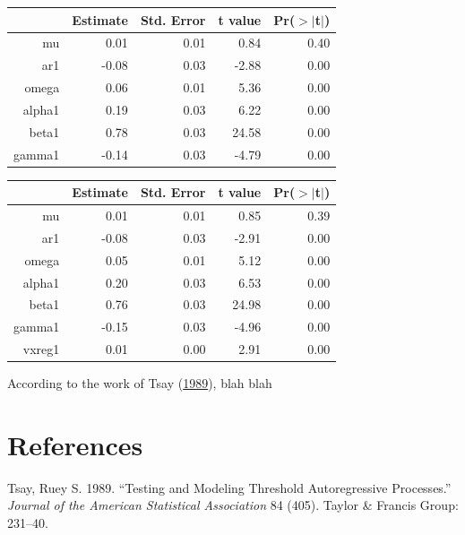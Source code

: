 \documentclass[11pt,preprint, authoryear]{elsarticle}
\let\origtable\table
\let\endorigtable\endtable
\renewenvironment{table}[1][2] {
    \expandafter\origtable\expandafter[H]
} {
    \endorigtable
}
\numberwithin{equation}{section}
\numberwithin{figure}{section}
\numberwithin{table}{section}
\begin{document}
\begin{table}[H]
\centering
\begin{tabular}{rrrrr}
  \hline
 &  Estimate &  Std. Error &  t value & Pr($>$$|$t$|$) \\ 
  \hline
mu & 0.01 & 0.01 & 0.84 & 0.40 \\ 
  ar1 & -0.08 & 0.03 & -2.88 & 0.00 \\ 
  omega & 0.06 & 0.01 & 5.36 & 0.00 \\ 
  alpha1 & 0.19 & 0.03 & 6.22 & 0.00 \\ 
  beta1 & 0.78 & 0.03 & 24.58 & 0.00 \\ 
  gamma1 & -0.14 & 0.03 & -4.79 & 0.00 \\ 
   \hline
\end{tabular}
\caption{GARCH11 \label{GARCH-A}} 
\end{table}\begin{table}[H]
\centering
\begin{tabular}{rrrrr}
  \hline
 &  Estimate &  Std. Error &  t value & Pr($>$$|$t$|$) \\ 
  \hline
mu & 0.01 & 0.01 & 0.85 & 0.39 \\ 
  ar1 & -0.08 & 0.03 & -2.91 & 0.00 \\ 
  omega & 0.05 & 0.01 & 5.12 & 0.00 \\ 
  alpha1 & 0.20 & 0.03 & 6.53 & 0.00 \\ 
  beta1 & 0.76 & 0.03 & 24.98 & 0.00 \\ 
  gamma1 & -0.15 & 0.03 & -4.96 & 0.00 \\ 
  vxreg1 & 0.01 & 0.00 & 2.91 & 0.00 \\ 
   \hline
\end{tabular}
\caption{GARCH11 with SLM external regressor  \label{GARCH-B}} 
\end{table}

According to the work of Tsay (\protect\hyperlink{ref-Tsay1989}{1989}),
blah blah

\section*{References}\label{references}

\hypertarget{refs}{}
\hypertarget{ref-Tsay1989}{}
Tsay, Ruey S. 1989. ``Testing and Modeling Threshold Autoregressive
Processes.'' \emph{Journal of the American Statistical Association} 84
(405). Taylor \& Francis Group: 231--40.




\end{document}
